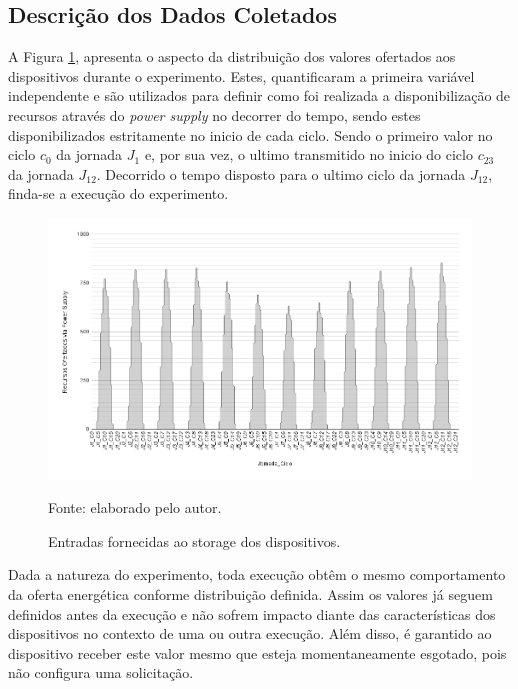 \subsection{Descrição dos Dados Coletados}

A Figura \ref{fig:cap6valoresofertados}, apresenta o aspecto da distribuição dos valores ofertados aos dispositivos durante o experimento. Estes, quantificaram a primeira variável independente e são utilizados para definir como foi realizada a disponibilização de recursos através do \textit{power supply} no decorrer do tempo, sendo estes disponibilizados estritamente no inicio de cada ciclo. Sendo o primeiro valor no ciclo $c_{0}$ da jornada $J_1$ e, por sua vez, o ultimo transmitido no inicio do ciclo $c_{23}$ da jornada $J_{12}$. Decorrido o tempo disposto para o ultimo ciclo da jornada $J_{12}$, finda-se a execução do experimento.

\begin{figure}[H]
	\centering
	
	\caption{Entradas fornecidas ao storage dos dispositivos.} 
	\label{fig:cap6valoresofertados}
	\noindent\includegraphics[width=1\linewidth]{Imagens/cap6/cap6valoresofertados.png} 
	
	Fonte: elaborado pelo autor.
\end{figure}

Dada a natureza do experimento, toda execução obtêm o mesmo comportamento da oferta energética conforme distribuição definida. Assim os valores já seguem definidos antes da execução e não sofrem impacto diante das características dos dispositivos no contexto de uma ou outra execução. Além disso, é garantido ao dispositivo receber este valor mesmo que esteja momentaneamente esgotado, pois não configura uma solicitação.

